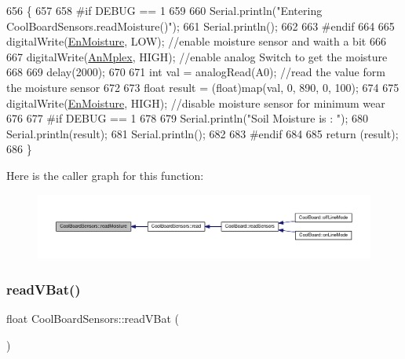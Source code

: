 \begin{DoxyCode}
656 \{
657 
658 \textcolor{preprocessor}{#if DEBUG == 1}
659     
660     Serial.println(\textcolor{stringliteral}{"Entering CoolBoardSensors.readMoisture()"});
661     Serial.println();
662     
663 \textcolor{preprocessor}{#endif}
664 
665     digitalWrite(\hyperlink{classCoolBoardSensors_a6177d02e14a057a2f171a2e930b5038d}{EnMoisture}, LOW);                 \textcolor{comment}{//enable moisture sensor and waith a bit}
666 
667     digitalWrite(\hyperlink{classCoolBoardSensors_a12ef28b1046219e0aee10bf64e28c4a5}{AnMplex}, HIGH);         \textcolor{comment}{//enable analog Switch to get the moisture}
668 
669     delay(2000);
670 
671     \textcolor{keywordtype}{int} val = analogRead(A0);                       \textcolor{comment}{//read the value form the moisture sensor}
672 
673     \textcolor{keywordtype}{float} result = (float)map(val, 0, 890, 0, 100); 
674 
675     digitalWrite(\hyperlink{classCoolBoardSensors_a6177d02e14a057a2f171a2e930b5038d}{EnMoisture}, HIGH);                  \textcolor{comment}{//disable moisture sensor for minimum wear}
676     
677 \textcolor{preprocessor}{#if DEBUG == 1 }
678 
679     Serial.println(\textcolor{stringliteral}{"Soil Moisture is : "});
680     Serial.println(result);
681     Serial.println();
682 
683 \textcolor{preprocessor}{#endif }
684 
685     \textcolor{keywordflow}{return} (result);
686 \}
\end{DoxyCode}
Here is the caller graph for this function\+:\nopagebreak
\begin{figure}[H]
\begin{center}
\leavevmode
\includegraphics[width=350pt]{classCoolBoardSensors_a8761bff50373c485f4465c8db47d0633_icgraph}
\end{center}
\end{figure}
\mbox{\label{classCoolBoardSensors_a6944b6ea7bce8e2fce1b434acfd9d5f3}} 
\subsubsection{\texorpdfstring{read\+V\+Bat()}{readVBat()}}
{\footnotesize\ttfamily float Cool\+Board\+Sensors\+::read\+V\+Bat (\begin{DoxyParamCaption}{ }\end{DoxyParamCaption})}

